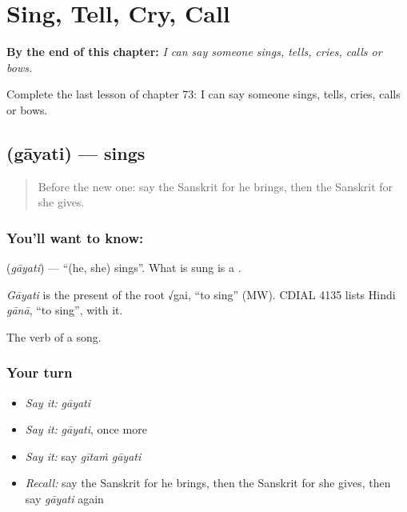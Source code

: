 
\chapter{Sing, Tell, Cry, Call}
\label{ch:sa-sing-tell-cry-call}

\begin{chapteropening}
\textbf{By the end of this chapter:} \emph{I can say someone sings, tells, cries, calls or bows.}

Complete the last lesson of chapter 73: I can say someone sings, tells, cries, calls or bows.
\end{chapteropening}

\section[\texorpdfstring{\sk{गायति} (gāyati)}{गायति (gāyati)}]{ (gāyati) — sings}

\label{lesson:SA-C73-sings}



\begin{quote}
Before the new one: say the Sanskrit for he brings, then the Sanskrit for she gives.
\end{quote}

\subsection*{You'll want to know: }
\textbf{} (\emph{gāyati}) — \textquotedblleft{}(he, she) sings\textquotedblright{}. What is sung is a \textbf{}.

\begin{cousinweb}
\emph{Gāyati} is the present of the root √gai, \textquotedblleft{}to sing\textquotedblright{} (MW). CDIAL 4135 lists Hindi \emph{gānā}, \textquotedblleft{}to sing\textquotedblright{}, with it.
\end{cousinweb}

\begin{grammarlens}[title={What you've built}]
The verb of a song.
\end{grammarlens}

\subsection*{Your turn}
\begin{itemize}
\raggedright
  \item \emph{Say it:} \emph{gāyati}
  \item \emph{Say it:} \emph{gāyati}, once more
  \item \emph{Say it:} say \emph{gītaṁ gāyati}
  \item \emph{Recall:} say the Sanskrit for he brings, then the Sanskrit for she gives, then say \emph{gāyati} again
\end{itemize}

